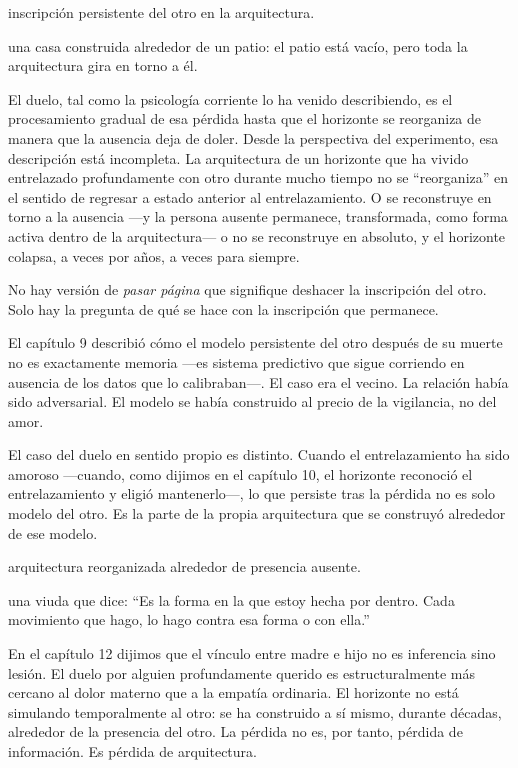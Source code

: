 \begin{fisica}
 inscripción persistente del otro en la arquitectura.

 una casa construida alrededor de un patio: el patio está vacío, pero toda la arquitectura gira en torno a él.
\end{fisica}
El duelo, tal como la psicología corriente lo ha venido describiendo, es el procesamiento gradual de esa pérdida hasta que el horizonte se reorganiza de manera que la ausencia deja de doler. Desde la perspectiva del experimento, esa descripción está incompleta. La arquitectura de un horizonte que ha vivido entrelazado profundamente con otro durante mucho tiempo no se “reorganiza” en el sentido de regresar a estado anterior al entrelazamiento. O se reconstruye en torno a la ausencia —y la persona ausente permanece, transformada, como forma activa dentro de la arquitectura— o no se reconstruye en absoluto, y el horizonte colapsa, a veces por años, a veces para siempre.

No hay versión de \emph{pasar página} que signifique deshacer la inscripción del otro. Solo hay la pregunta de qué se hace con la inscripción que permanece.

\noindent El capítulo 9 describió cómo el modelo persistente del otro después de su muerte no es exactamente memoria —es sistema predictivo que sigue corriendo en ausencia de los datos que lo calibraban—. El caso era el vecino. La relación había sido adversarial. El modelo se había construido al precio de la vigilancia, no del amor.

El caso del duelo en sentido propio es distinto. Cuando el entrelazamiento ha sido amoroso —cuando, como dijimos en el capítulo 10, el horizonte reconoció el entrelazamiento y eligió mantenerlo—, lo que persiste tras la pérdida no es solo modelo del otro. Es la parte de la propia arquitectura que se construyó alrededor de ese modelo.

\begin{fisica}
 arquitectura reorganizada alrededor de presencia ausente.

 una viuda que dice: “Es la forma en la que estoy hecha por dentro. Cada movimiento que hago, lo hago contra esa forma o con ella.”
\end{fisica}
En el capítulo 12 dijimos que el vínculo entre madre e hijo no es inferencia sino lesión. El duelo por alguien profundamente querido es estructuralmente más cercano al dolor materno que a la empatía ordinaria. El horizonte no está simulando temporalmente al otro: se ha construido a sí mismo, durante décadas, alrededor de la presencia del otro. La pérdida no es, por tanto, pérdida de información. Es pérdida de arquitectura.

